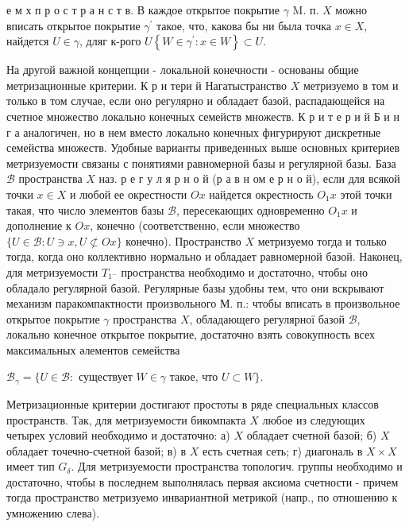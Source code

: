 \documentclass[10pt]{article}
\begin{document}
е м х п р о с т р а н с т в. В каждое открытое покрытие $\gamma$ M. п. $X$ можно вписать открытое покрытие $\gamma^{\prime}$ такое, что, какова бы ни была точка $x \in X$, найдется $U \in \gamma$, дляг к-рого $U\left\{W \in \gamma^{\prime}: x \in W\right\} \subset U$.



На другой важной концепции - локальной конечности - основаны общие метризационные критерии. К р и тери й Нагатыстранство $X$ метризуемо в том и только в том случае, если оно регулярно и обладает базой, распадающейся на счетное множество локально конечных семейств множеств. К р и т е р и й Б и н г а аналогичен, но в нем вместо локально конечных фигурируют дискретные семейства множеств. Удобные варианты приведенных выше основных критериев метризуемости связаны с понятиями равномерной базы и регулярной базы. База $\mathscr{B}$ пространства $X$ наз. р е г у л я р н о й (р а в н ом е р н о й), если для всякой точки $x \in X$ и любой ее окрестности $O x$ найдется окрестность $O_{1} x$ этой точки такая, что число элементов базы $\mathscr{B}$, пересекающих одновременно $O_{1} x$ и дополнение к $O x$, конечно (соответственно, если множество $\{U \in \mathscr{B}: U \ni x, U \not \subset O x\}$ конечно). Пространство $X$ метризуемо тогда и только тогда, когда оно коллективно нормально и обладает равномерной базой. Наконец, для метризуемости $T_{1^{-}}$ пространства необходимо и достаточно, чтобы оно обладало регулярной базой. Регулярные базы удобны тем, что они вскрывают механизм паракомпактности произвольного М. п.: чтобы вписать в произвольное открытое покрытие $\gamma$ пространства $X$, обладающего регулярної базой $\mathscr{B}$, локально конечное открытое покрытие, достаточно взять совокупность всех максимальных әлементов семейства



$\mathscr{B}_{\gamma}=\{U \in \mathscr{B}:$ существует $W \in \gamma$ такое, что $U \subset W\}$.



Метризационные критерии достигают простоты в ряде специальных классов пространств. Так, для метризуемости бикомпакта $X$ любое из следующих четырех условий необходимо и достаточно: а) $X$ обладает счетной базой; б) $X$ обладает точечно-счетной базой; в) в $X$ есть счетная сеть; г) диагональ в $X \times X$ имеет тип $G_{\delta}$. Для метризуемости пространства топологич. группы необходимо и достаточно, чтобы в последнем выполнялась первая аксиома счетности - причем тогда пространство метризуемо инвариантной метрикой (напр., по отношению к умножению слева).
\end{document}
